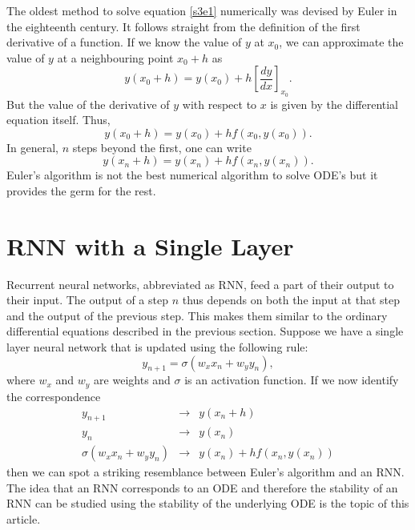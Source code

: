 \documentclass{article}
\numberwithin{equation}{section}
\begin{document}
The oldest method to solve equation \eqref{s3e1} numerically was devised 
by Euler in the eighteenth century. It follows straight from the definition
of the first derivative of a function. If we know the value of $y$ at $x_0$,
we can approximate the value of $y$ at a neighbouring point $x_0 + h$ as
\begin{equation}\label{s3e2}
y(x_0 + h) = y(x_0) + h\left[\frac{dy}{dx}\right]_{x_0}.
\end{equation}
But the value of the derivative of $y$ with respect to $x$ is given by
the differential equation itself. Thus,
\begin{equation}\label{s3e3}
y(x_0 + h) = y(x_0) + h f(x_0, y(x_0)).
\end{equation}
In general, $n$ steps beyond the first, one can write
\begin{equation}\label{s3e4}
y(x_n + h) = y(x_{n}) + h f(x_{n}, y(x_{n})).
\end{equation}
Euler's algorithm is not the best numerical algorithm to solve ODE's but
it provides the germ for the rest.

\section{RNN with a Single Layer}\label{s4}
Recurrent neural networks, abbreviated as RNN, feed a part of their output
to their input. The output of a step $n$ thus depends on both the input
at that step and the output of the previous step. This makes them similar
to the ordinary differential equations described in the previous section.
Suppose we have a single layer neural network that is updated using the
following rule:
\begin{equation}\label{s4e1}
y_{n+1} = \sigma(w_x x_{n} + w_y y_n),
\end{equation}
where $w_x$ and $w_y$ are weights and $\sigma$ is an activation function. 
If we now identify the correspondence
\begin{eqnarray}
y_{n+1} &\rightarrow& y(x_n + h) \\
y_{n} &\rightarrow& y(x_n) \\
\sigma(w_x x_n + w_y y_n) &\rightarrow& y(x_n) + hf(x_n, y(x_n))
\end{eqnarray}
then we can spot a striking resemblance between Euler's algorithm and an
RNN. The idea that an RNN corresponds to an ODE and therefore the stability
of an RNN can be studied using the stability of the underlying ODE is the
topic of this article.
\end{document}
